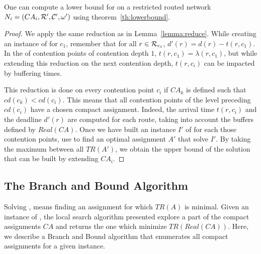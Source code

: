 \begin{corollary}\label{th:restrictedlower}
One can compute a lower bound for \spall on a restricted routed network $N_i = (CA_i,{\cal R}',{\cal C}',\omega')$ using theorem~\ref{th:lowerbound}.
\end{corollary}
\begin{proof}
We apply the same reduction as in Lemma~\ref{lemma:reduce}. While creating an instance of \wta for $c_1$, remember that for all $r \in {\cal R}_{c_1}$,  $d'(r) = d(r) - t(r,c_1)$. In the of contention points of contention depth $1$, $t(r,c_1) = \lambda(r,c_1)$, but while extending this reduction on the next contention depth, $t(r,c_i)$ can be impacted by buffering times.

This reduction is done on every contention point $c_i$ if $CA_k$ is defined such that $cd(c_k) < cd(c_i)$. This means that all contention points of the level preceding $cd(c_i)$ have a chosen compact assignment. Indeed, the arrival time $t(r,c_i)$ and the deadline $d'(r)$ are computed for each route, taking into account the buffers defined by $Real(CA)$.
Once we have built an instance $I'$ of \wta for each those contention points, use \ASPMLS to find an optimal assignment $A'$ that solve $I'$. By taking the maximum between all $TR(A')$, we obtain the upper bound of the solution that can be built by extending $CA_i$.
\end{proof}





\subsection{The Branch and Bound Algorithm}\label{sec:branchBound}


Solving \spall, means finding an assignment for which $TR(A)$ is minimal. 
Given an instance of \spall, the local search algorithm presented explore a part of the compact assignments $CA$ and returns the one which minimize $TR(Real(CA))$. Here, we describe a Branch and Bound algorithm that enumerates all compact assignments for a given instance.


